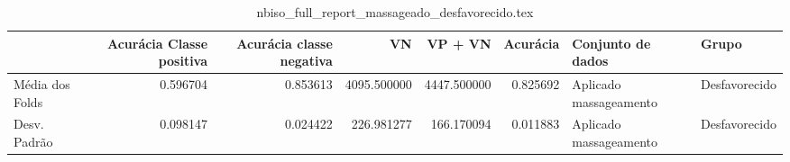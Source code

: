 \begin{table}
\centering
\caption{nbiso_full_report_massageado_desfavorecido.tex}
\label{nbiso_full_report_massageado_desfavorecido.tex}
\begin{tabular}{lrrrrrll}
\toprule
{}               &  Acurácia Classe positiva &  Acurácia classe negativa &          VN  &     VP + VN  &  Acurácia &       Conjunto de dados &          Grupo \\
\midrule
Média dos Folds &                  0.596704 &                  0.853613 &  4095.500000 &  4447.500000 &  0.825692 &  Aplicado massageamento &  Desfavorecido \\
Desv. Padrão    &                  0.098147 &                  0.024422 &   226.981277 &   166.170094 &  0.011883 &  Aplicado massageamento &  Desfavorecido \\
\bottomrule
\end{tabular}
\end{table}

